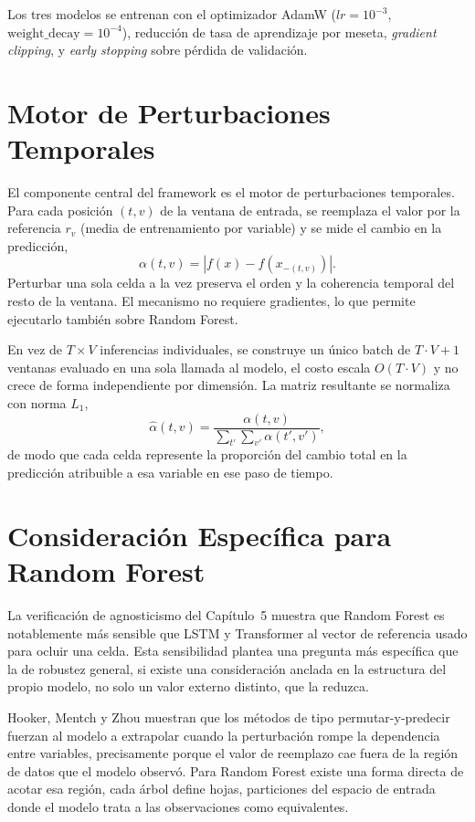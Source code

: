 Los tres modelos se entrenan con el optimizador AdamW ($lr=10^{-3}$, $\text{weight\_decay}=10^{-4}$), reducción de tasa de aprendizaje por meseta, \emph{gradient clipping}, y \emph{early stopping} sobre pérdida de validación.

\section{Motor de Perturbaciones Temporales}

El componente central del framework es el motor de perturbaciones temporales. Para cada posición $(t,v)$ de la ventana de entrada, se reemplaza el valor por la referencia $r_v$ (media de entrenamiento por variable) y se mide el cambio en la predicción,
\begin{equation}
    \alpha(t,v) = \left| f(x) - f(x_{-(t,v)}) \right|.
\end{equation}
Perturbar una sola celda a la vez preserva el orden y la coherencia temporal del resto de la ventana. El mecanismo no requiere gradientes, lo que permite ejecutarlo también sobre Random Forest.

En vez de $T \times V$ inferencias individuales, se construye un único batch de $T{\cdot}V{+}1$ ventanas evaluado en una sola llamada al modelo, el costo escala $O(T \cdot V)$ y no crece de forma independiente por dimensión. La matriz resultante se normaliza con norma $L_1$,
\begin{equation}
    \hat{\alpha}(t,v) = \frac{\alpha(t,v)}{\sum_{t'}\sum_{v'} \alpha(t',v')},
\end{equation}
de modo que cada celda represente la proporción del cambio total en la predicción atribuible a esa variable en ese paso de tiempo.

\section{Consideración Específica para Random Forest}
\label{sec:leaf_reference_propuesta}

La verificación de agnosticismo del Capítulo~5 muestra que Random Forest es notablemente más sensible que LSTM y Transformer al vector de referencia usado para ocluir una celda. Esta sensibilidad plantea una pregunta más específica que la de robustez general, si existe una consideración anclada en la estructura del propio modelo, no solo un valor externo distinto, que la reduzca.

Hooker, Mentch y Zhou \cite{hooker2021} muestran que los métodos de tipo permutar-y-predecir fuerzan al modelo a extrapolar cuando la perturbación rompe la dependencia entre variables, precisamente porque el valor de reemplazo cae fuera de la región de datos que el modelo observó. Para Random Forest existe una forma directa de acotar esa región, cada árbol define hojas, particiones del espacio de entrada donde el modelo trata a las observaciones como equivalentes.

